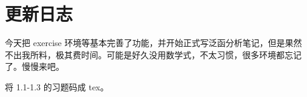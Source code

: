 \chapter{更新日志}


\begin{changelog}[date = {2022-03-05}]
  今天把 exercise 环境等基本完善了功能，并开始正式写泛函分析笔记，但是果然不出我所料，极其费时间。可能是好久没用数学式，不太习惯，很多环境都忘记了。慢慢来吧。

  将 1.1-1.3 的习题码成 tex。
\end{changelog}